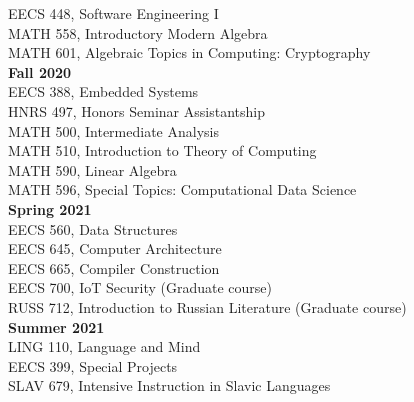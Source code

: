 \documentclass[a4paper, 10pt]{article}
\begin{document}
EECS 448, Software Engineering I\\
MATH 558, Introductory Modern Algebra\\
MATH 601, Algebraic Topics in Computing: Cryptography\\
\textbf{Fall 2020}\\
EECS 388, Embedded Systems\\
HNRS 497, Honors Seminar Assistantship\\
MATH 500, Intermediate Analysis\\
MATH 510, Introduction to Theory of Computing\\
MATH 590, Linear Algebra\\
MATH 596, Special Topics: Computational Data Science\\
\textbf{Spring 2021}\\
EECS 560, Data Structures \\
EECS 645, Computer Architecture\\
EECS 665, Compiler Construction\\
EECS 700, IoT Security (Graduate course)\\
RUSS 712, Introduction to Russian Literature (Graduate course)\\
\textbf{Summer 2021}\\
LING 110, Language and Mind\\
EECS 399, Special Projects\\
SLAV 679, Intensive Instruction in Slavic Languages\\
\end{document}
